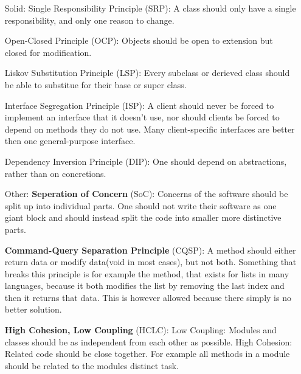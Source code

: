 \documentclass{article}
\begin{document}
\begin{enumerate}
    \item[\huge{Solid:}]
        {\huge S}ingle Responsibility Principle (SRP):\newline
        A class should only have a single responsibility, and only one reason to change.

            {\huge O}pen-Closed Principle (OCP):\newline
        Objects should be open to extension but closed for modification.

            {\huge L}iskov Substitution Principle (LSP):\newline
        Every subclass or derieved class should be able to substitue
        for their base or super class.

            {\huge I}nterface Segregation Principle (ISP):\newline
        A client should never be forced to implement an interface that it doesn't use, nor
        should clients be forced to depend on methods they do not use. Many
        client-specific interfaces are better then one general-purpose interface.

            {\huge D}ependency Inversion Principle (DIP):\newline
        One should depend on abstractions, rather than on concretions.

    \item[\huge Other:]
        \textbf{Seperation of Concern} (SoC):\newline
        Concerns of the software should be split up into individual parts.
        One should not write their software as one giant block and should instead
        split the code into smaller more distinctive parts.

        \textbf{Command-Query Separation Principle} (CQSP):\newline
        A method should either return data or modify data(void in most cases),
        but not both.\newline
        Something that breaks this principle is for example the  method, that
        exists for lists in many languages, because it both modifies the list by removing
        the last index and then it returns that data. This is however allowed because there
        simply is no better solution.

        \textbf{High Cohesion, Low Coupling} (HCLC):\newline
        Low Coupling: Modules and classes should be as independent from each other as possible.
        \newline
        High Cohesion: Related code should be close together. For example all methods
        in a module should be related to the modules distinct task.


\end{enumerate}
\end{document}
